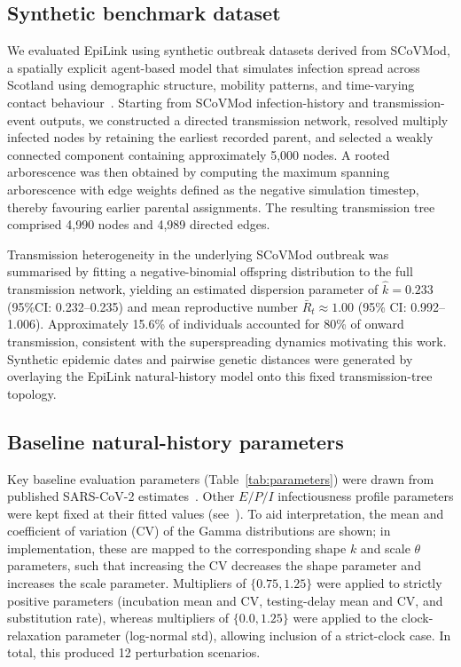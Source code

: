 \documentclass[10pt,letterpaper]{article}
\begin{document}
\subsection*{Synthetic benchmark dataset}

We evaluated EpiLink using synthetic outbreak datasets derived from SCoVMod, a spatially explicit agent-based model that simulates infection spread across Scotland using demographic structure, mobility patterns, and time-varying contact behaviour~\cite{Banks2022}. Starting from SCoVMod infection-history and transmission-event outputs, we constructed a directed transmission network, resolved multiply infected nodes by retaining the earliest recorded parent, and selected a weakly connected component containing approximately 5{,}000 nodes. A rooted arborescence was then obtained by computing the maximum spanning arborescence with edge weights defined as the negative simulation timestep, thereby favouring earlier parental assignments. The resulting transmission tree comprised 4{,}990 nodes and 4{,}989 directed edges.

Transmission heterogeneity in the underlying SCoVMod outbreak was summarised by fitting a negative-binomial offspring distribution to the full transmission network, yielding an estimated dispersion parameter of $\hat{k} = 0.233$ (95\%CI: 0.232--0.235) and mean reproductive number $\bar{R}_t \approx 1.00$ (95\% CI: 0.992--1.006). Approximately 15.6\% of individuals accounted for 80\% of onward transmission, consistent with the superspreading dynamics motivating this work. Synthetic epidemic dates and pairwise genetic distances were generated by overlaying the EpiLink natural-history model onto this fixed transmission-tree
topology.

\subsection*{Baseline natural-history parameters}

Key baseline evaluation parameters (Table~\ref{tab:parameters}) were drawn from published SARS-CoV-2 estimates~\cite{Hart2021, Duchene2020, vanDorp2020}. Other $E/P/I$ infectiousness profile parameters were kept fixed at their fitted values (see~). To aid interpretation, the mean and coefficient of variation (CV) of the Gamma distributions are shown; in implementation, these are mapped to the corresponding shape $k$ and scale $\theta$ parameters, such that increasing the CV decreases the shape parameter and increases the scale parameter. Multipliers of $\{0.75, 1.25\}$ were applied to strictly positive parameters (incubation mean and CV, testing-delay mean and CV, and substitution rate), whereas multipliers of $\{0.0, 1.25\}$ were applied to the clock-relaxation parameter (log-normal std), allowing inclusion of a strict-clock case. In total, this produced 12 perturbation scenarios.
\end{document}
